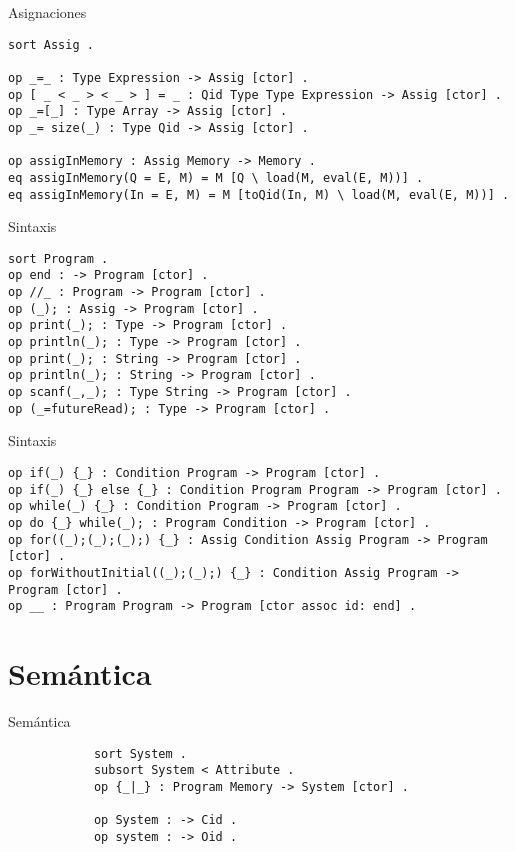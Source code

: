 \documentclass{beamer}
\begin{document}
    \begin{frame}[fragile]{Asignaciones}
        \begin{verbatim}
sort Assig .
 
op _=_ : Type Expression -> Assig [ctor] .
op [ _ < _ > < _ > ] = _ : Qid Type Type Expression -> Assig [ctor] .
op _=[_] : Type Array -> Assig [ctor] .
op _= size(_) : Type Qid -> Assig [ctor] .

op assigInMemory : Assig Memory -> Memory .
eq assigInMemory(Q = E, M) = M [Q \ load(M, eval(E, M))] .
eq assigInMemory(In = E, M) = M [toQid(In, M) \ load(M, eval(E, M))] .
        \end{verbatim}
    \end{frame}

    \begin{frame}[fragile]{Sintaxis}
        \begin{verbatim}
sort Program .
op end : -> Program [ctor] .
op //_ : Program -> Program [ctor] .
op (_); : Assig -> Program [ctor] .
op print(_); : Type -> Program [ctor] .
op println(_); : Type -> Program [ctor] .
op print(_); : String -> Program [ctor] .
op println(_); : String -> Program [ctor] .
op scanf(_,_); : Type String -> Program [ctor] .
op (_=futureRead); : Type -> Program [ctor] .
        \end{verbatim}
    \end{frame}

    \begin{frame}[fragile]{Sintaxis}
        \begin{verbatim}  
op if(_) {_} : Condition Program -> Program [ctor] .
op if(_) {_} else {_} : Condition Program Program -> Program [ctor] .
op while(_) {_} : Condition Program -> Program [ctor] .
op do {_} while(_); : Program Condition -> Program [ctor] .
op for((_);(_);(_);) {_} : Assig Condition Assig Program -> Program [ctor] .
op forWithoutInitial((_);(_);) {_} : Condition Assig Program -> Program [ctor] .
op __ : Program Program -> Program [ctor assoc id: end] .
        \end{verbatim}
    \end{frame}


    \section{Semántica}
    \begin{frame}[fragile]{Semántica}
        \begin{verbatim}  
            sort System .
            subsort System < Attribute .
            op {_|_} : Program Memory -> System [ctor] .

            op System : -> Cid . 
            op system : -> Oid . 
        \end{verbatim}
    \end{frame}
\end{document}
